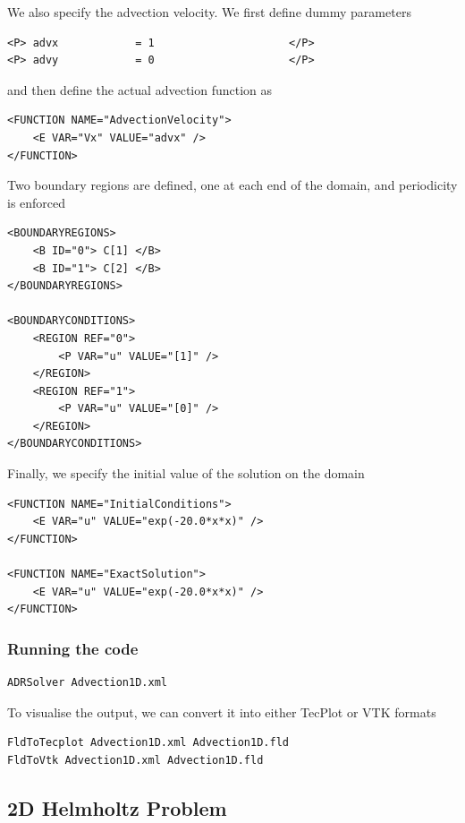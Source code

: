 We also specify the advection velocity. We first define dummy parameters
\begin{lstlisting}[style=XMLStyle]
<P> advx            = 1                     </P>
<P> advy            = 0                     </P>
\end{lstlisting}
and then define the actual advection function as
\begin{lstlisting}[style=XMLStyle]
<FUNCTION NAME="AdvectionVelocity">
    <E VAR="Vx" VALUE="advx" />
</FUNCTION>
\end{lstlisting}

Two boundary regions are defined, one at each end of the domain, and periodicity
is enforced
\begin{lstlisting}[style=XMLStyle] 
<BOUNDARYREGIONS>
    <B ID="0"> C[1] </B>
    <B ID="1"> C[2] </B>
</BOUNDARYREGIONS>

<BOUNDARYCONDITIONS>
    <REGION REF="0">
        <P VAR="u" VALUE="[1]" />
    </REGION>
    <REGION REF="1">
        <P VAR="u" VALUE="[0]" />
    </REGION>
</BOUNDARYCONDITIONS>
\end{lstlisting}

Finally, we specify the initial value of the solution on the domain
\begin{lstlisting}[style=XMLStyle]
<FUNCTION NAME="InitialConditions">
    <E VAR="u" VALUE="exp(-20.0*x*x)" />
</FUNCTION>

<FUNCTION NAME="ExactSolution">
    <E VAR="u" VALUE="exp(-20.0*x*x)" />
</FUNCTION>
\end{lstlisting}

\subsubsection{Running the code}
\begin{lstlisting}[style=BashInputStyle]
ADRSolver Advection1D.xml
\end{lstlisting}

To visualise the output, we can convert it into either TecPlot or VTK formats
\begin{lstlisting}[style=BashInputStyle]
FldToTecplot Advection1D.xml Advection1D.fld
FldToVtk Advection1D.xml Advection1D.fld
\end{lstlisting}


\subsection{2D Helmholtz Problem}

